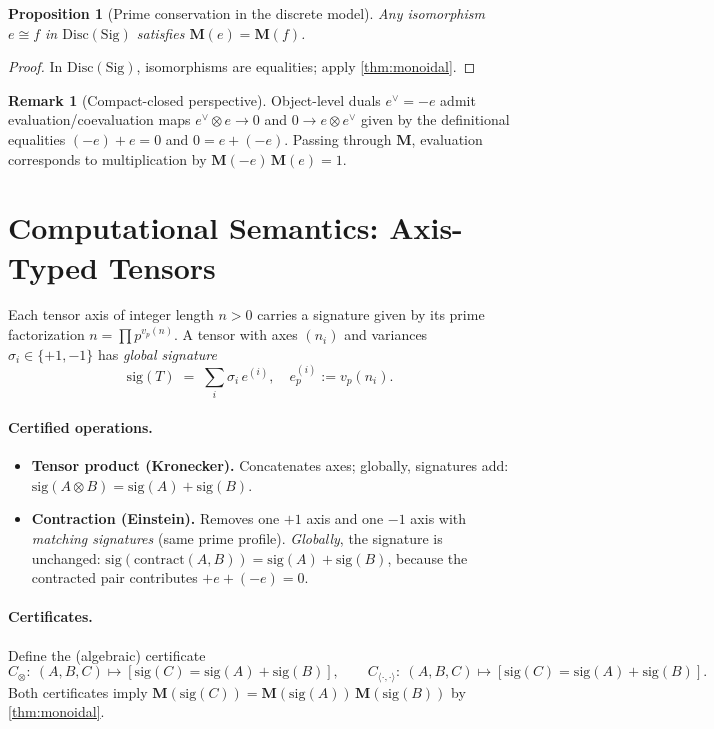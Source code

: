 \documentclass[11pt]{article}
\theoremstyle{plain}
\newtheorem{proposition}[theorem]{Proposition}
\theoremstyle{definition}
\newtheorem{remark}[theorem]{Remark}
\newcommand{\Sig}{\mathrm{Sig}}
\newcommand{\D}{\mathrm{Disc}} %
\newcommand{\M}{\mathbf{M}} %
\begin{document}
\begin{proposition}[Prime conservation in the discrete model]
Any isomorphism $e\cong f$ in $\D(\Sig)$ satisfies $\M(e)=\M(f)$.
\end{proposition}
\begin{proof}
In $\D(\Sig)$, isomorphisms are equalities; apply \cref{thm:monoidal}.
\end{proof}

\begin{remark}[Compact-closed perspective]
Object-level duals $e^\vee=-e$ admit evaluation/coevaluation maps $e^\vee\otimes e\to 0$ and $0\to e\otimes e^\vee$ given by the definitional equalities $(-e)+e=0$ and $0=e+(-e)$. Passing through $\M$, evaluation corresponds to multiplication by $\M(-e)\,\M(e)=1$.
\end{remark}

\section{Computational Semantics: Axis-Typed Tensors}
\label{sec:computational}
Each tensor axis of integer length $n>0$ carries a signature given by its prime factorization $n=\prod p^{v_p(n)}$. A tensor with axes $(n_i)$ and variances $\sigma_i\in\{+1,-1\}$ has \emph{global signature}
\[
  \mathrm{sig}(T)\;=\;\sum_i \sigma_i\, e^{(i)},\quad e^{(i)}_p:=v_p(n_i).
\]

\paragraph{Certified operations.}
\begin{itemize}[leftmargin=*]
  \item \textbf{Tensor product (Kronecker).} Concatenates axes; globally, signatures add: $\mathrm{sig}(A\otimes B)=\mathrm{sig}(A)+\mathrm{sig}(B)$.
  \item \textbf{Contraction (Einstein).} Removes one $+1$ axis and one $-1$ axis with \emph{matching signatures} (same prime profile). \emph{Globally}, the signature is unchanged:
  $\mathrm{sig}(\mathrm{contract}(A,B))=\mathrm{sig}(A)+\mathrm{sig}(B)$, because the contracted pair contributes $+e+(-e)=0$.
\end{itemize}

\paragraph{Certificates.} Define the (algebraic) certificate
\[
  C_{\otimes}:\ (A,B,C)\mapsto [\mathrm{sig}(C)=\mathrm{sig}(A)+\mathrm{sig}(B)],\qquad
  C_{\langle\cdot,\cdot\rangle}:\ (A,B,C)\mapsto [\mathrm{sig}(C)=\mathrm{sig}(A)+\mathrm{sig}(B)].
\]
Both certificates imply $\M(\mathrm{sig}(C))=\M(\mathrm{sig}(A))\,\M(\mathrm{sig}(B))$ by \cref{thm:monoidal}.
\end{document}
